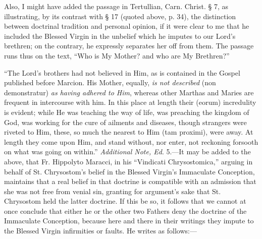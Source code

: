 Also, I might have added the passage in Tertullian, Carn. Christ. §
7, as illustrating, by its contrast with § 17 (quoted above, p. 34),
the distinction between doctrinal tradition and personal opinion, if it
were clear to me that he included the Blessed Virgin in the unbelief
which he imputes to our Lord's brethren; on the contrary, he expressly
separates her off from them. The passage runs thus on the text,
``Who is My Mother? and who are My Brethren?''


``The Lord's brothers had not believed in Him, as is contained in
the Gospel published before Marcion. His Mother, equally, \emph{is not
described} (non demonstratur) \emph{as having adhered to Him},
whereas other Marthas and Maries are frequent in intercourse with him.
In this place at length their (eorum) incredulity is evident; while He was teaching the way of life, was preaching the kingdom of God,
was working for the cure of ailments and diseases, though strangers were
riveted to Him, these, so much the nearest to Him (tam proximi), were
away. At length they come upon Him, and stand without, nor enter, not
reckoning forsooth on what was going on within.''
\emph{Additional Note, Ed}. 5.—It may be added to the above, that Fr.
Hippolyto Maracci, in his ``Vindicati Chrysostomica,'' arguing
in behalf of St. Chrysostom's belief in the Blessed Virgin's Immaculate
Conception, maintains that a real belief in that doctrine is compatible
with an admission that she was not free from venial sin, granting for
argument's sake that St. Chrysostom held the latter doctrine. If this be
so, it follows that we cannot at once conclude that either he or the
other two Fathers deny the doctrine of the Immaculate Conception,
because here and there in their writings they impute to the Blessed
Virgin infirmities or faults. He writes as follows:—


